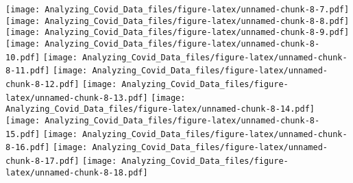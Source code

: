 \documentclass[
]{article}
\newenvironment{Shaded}{\begin{snugshade}}{\end{snugshade}}
\newcommand{\CommentTok}[1]{\textcolor[rgb]{0.56,0.35,0.01}{\textit{#1}}}
\newcommand{\FunctionTok}[1]{\textcolor[rgb]{0.13,0.29,0.53}{\textbf{#1}}}
\newcommand{\NormalTok}[1]{#1}
\newcommand{\SpecialCharTok}[1]{\textcolor[rgb]{0.81,0.36,0.00}{\textbf{#1}}}
\newcommand{\StringTok}[1]{\textcolor[rgb]{0.31,0.60,0.02}{#1}}
\begin{document}
\begin{Shaded}
\end{Shaded}

\texttt{[image: Analyzing\_Covid\_Data\_files/figure-latex/unnamed-chunk-8-7.pdf]}
\texttt{[image: Analyzing\_Covid\_Data\_files/figure-latex/unnamed-chunk-8-8.pdf]}
\texttt{[image: Analyzing\_Covid\_Data\_files/figure-latex/unnamed-chunk-8-9.pdf]}
\texttt{[image: Analyzing\_Covid\_Data\_files/figure-latex/unnamed-chunk-8-10.pdf]}
\texttt{[image: Analyzing\_Covid\_Data\_files/figure-latex/unnamed-chunk-8-11.pdf]}
\texttt{[image: Analyzing\_Covid\_Data\_files/figure-latex/unnamed-chunk-8-12.pdf]}
\texttt{[image: Analyzing\_Covid\_Data\_files/figure-latex/unnamed-chunk-8-13.pdf]}
\texttt{[image: Analyzing\_Covid\_Data\_files/figure-latex/unnamed-chunk-8-14.pdf]}
\texttt{[image: Analyzing\_Covid\_Data\_files/figure-latex/unnamed-chunk-8-15.pdf]}
\texttt{[image: Analyzing\_Covid\_Data\_files/figure-latex/unnamed-chunk-8-16.pdf]}
\texttt{[image: Analyzing\_Covid\_Data\_files/figure-latex/unnamed-chunk-8-17.pdf]}
\texttt{[image: Analyzing\_Covid\_Data\_files/figure-latex/unnamed-chunk-8-18.pdf]}
\end{document}
